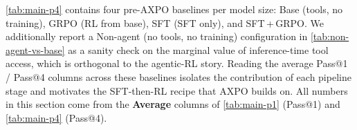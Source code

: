 \documentclass{llmxive}
\begin{document}
\autoref{tab:main-p4} contains four pre-AXPO baselines per model size: Base (tools, no training), GRPO (RL from base), SFT (SFT only), and SFT\,+\,GRPO. We additionally report a Non-agent (no tools, no training) configuration in \autoref{tab:non-agent-vs-base} as a sanity check on the marginal value of inference-time tool access, which is orthogonal to the agentic-RL story. Reading the average Pass@1 / Pass@4 columns across these baselines isolates the contribution of each pipeline stage and motivates the SFT-then-RL recipe that AXPO builds on. All numbers in this section come from the \textbf{Average} columns of \autoref{tab:main-p1} (Pass@1) and \autoref{tab:main-p4} (Pass@4).
\begin{table}[t]
    \vspace{-0.1in}
    \label{tab:non-agent-vs-base}
    \centering
    \scriptsize
\end{table}
\end{document}

